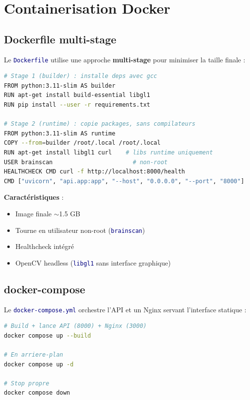 \documentclass[11pt,a4paper,oneside]{report}
\newcommand{\code}[1]{\texttt{\textcolor{navy}{#1}}}
\begin{document}
\section{Containerisation Docker}

\subsection{Dockerfile multi-stage}

Le \code{Dockerfile} utilise une approche \textbf{multi-stage} pour minimiser la taille finale :

\begin{lstlisting}[language=Bash, caption={Stages du Dockerfile}]
# Stage 1 (builder) : installe deps avec gcc
FROM python:3.11-slim AS builder
RUN apt-get install build-essential libgl1
RUN pip install --user -r requirements.txt

# Stage 2 (runtime) : copie packages, sans compilateurs
FROM python:3.11-slim AS runtime
COPY --from=builder /root/.local /root/.local
RUN apt-get install libgl1 curl    # libs runtime uniquement
USER brainscan                       # non-root
HEALTHCHECK CMD curl -f http://localhost:8000/health
CMD ["uvicorn", "api.app:app", "--host", "0.0.0.0", "--port", "8000"]
\end{lstlisting}

\textbf{Caractéristiques} :
\begin{itemize}
\item Image finale $\sim$1.5 GB
\item Tourne en utilisateur non-root (\code{brainscan})
\item Healthcheck intégré
\item OpenCV headless (\code{libgl1} sans interface graphique)
\end{itemize}

\subsection{docker-compose}

Le \code{docker-compose.yml} orchestre l'API et un Nginx servant l'interface statique :

\begin{lstlisting}[language=Bash, caption={Lancement Docker}]
# Build + lance API (8000) + Nginx (3000)
docker compose up --build

# En arriere-plan
docker compose up -d

# Stop propre
docker compose down
\end{lstlisting}
\end{document}
